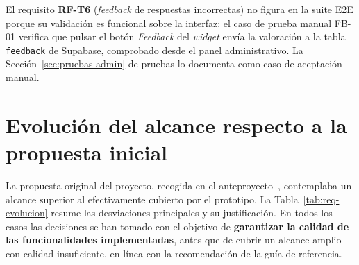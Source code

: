 El requisito \textbf{RF-T6} (\textit{feedback} de respuestas incorrectas) no figura en la suite E2E porque su validación es funcional sobre la interfaz: el caso de prueba manual FB-01 verifica que pulsar el botón \emph{Feedback} del \textit{widget} envía la valoración a la tabla \texttt{feedback} de Supabase, comprobado desde el panel administrativo. La Sección~\ref{sec:pruebas-admin} de pruebas lo documenta como caso de aceptación manual.

\section{Evolución del alcance respecto a la propuesta inicial}\label{sec:req-evolucion}

La propuesta original del proyecto, recogida en el anteproyecto~\cite{segura2024guiatfg}, contemplaba un alcance superior al efectivamente cubierto por el prototipo. La Tabla~\ref{tab:req-evolucion} resume las desviaciones principales y su justificación. En todos los casos las decisiones se han tomado con el objetivo de \textbf{garantizar la calidad de las funcionalidades implementadas}, antes que de cubrir un alcance amplio con calidad insuficiente, en línea con la recomendación de la guía de referencia.

